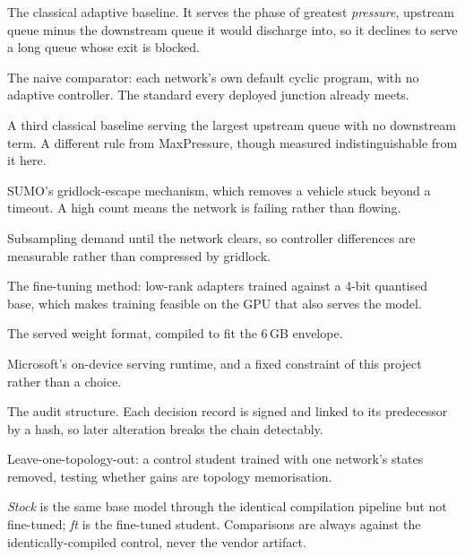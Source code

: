 \begin{description}[leftmargin=0pt, itemsep=2pt]
\item[MaxPressure.] The classical adaptive baseline. It serves the phase of greatest
\emph{pressure}, upstream queue minus the downstream queue it would discharge into, so
it declines to serve a long queue whose exit is blocked.

\item[Fixed-time floor.] The naive comparator: each network's own default cyclic
program, with no adaptive controller. The standard every deployed junction already meets.

\item[Longest-queue-first.] A third classical baseline serving the largest upstream
queue with no downstream term. A different rule from MaxPressure, though measured
indistinguishable from it here.

\item[Teleport.] SUMO's gridlock-escape mechanism, which removes a vehicle stuck beyond
a timeout. A high count means the network is failing rather than flowing.

\item[Demand calibration.] Subsampling demand until the network clears, so controller
differences are measurable rather than compressed by gridlock.

\item[QLoRA.] The fine-tuning method: low-rank adapters trained against a 4-bit
quantised base, which makes training feasible on the GPU that also serves the model.

\item[int4 ONNX.] The served weight format, compiled to fit the 6\,GB envelope.

\item[Foundry Local.] Microsoft's on-device serving runtime, and a fixed constraint of
this project rather than a choice.

\item[Ed25519 hash chain.] The audit structure. Each decision record is signed and
linked to its predecessor by a hash, so later alteration breaks the chain detectably.

\item[LOTO.] Leave-one-topology-out: a control student trained with one network's states
removed, testing whether gains are topology memorisation.

\item[Stock, ft.] \emph{Stock} is the same base model through the identical compilation
pipeline but not fine-tuned; \emph{ft} is the fine-tuned student. Comparisons are always
against the identically-compiled control, never the vendor artifact.

\end{description}
